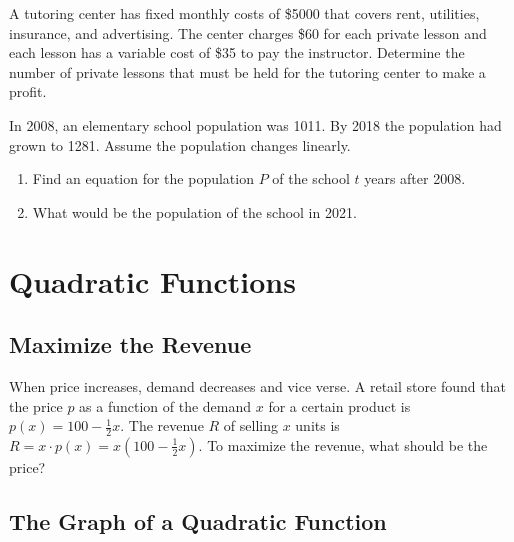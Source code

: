 \documentclass[
  en,11pt]{elegantbook}
\newcommand{\size}[2]{{\fontsize{#1}{0}\selectfont#2}}
\newenvironment{rmdthink}{
	\vspace*{0.5\baselineskip}
	\par\noindent
	\makebox[-4pt][r]{\color{green!90}\size{12}{\faLightbulbO}\,\,}
    \begin{tcolorbox}[
    enhanced,
    title={\textbf{\color{second}Think}},
    title style={left color=blue!10!green!20!white,right color=yellow!20!blue!20!white},
    colback=green!20!white,
    ]
    \sffamily
}{
    \end{tcolorbox}
	\par\ignorespacesafterend
}
\let\BeginKnitrBlock\begin \let\EndKnitrBlock\end
\begin{document}
\BeginKnitrBlock{exercise}
\protect\hypertarget{exr:unnamed-chunk-258}{}{\label{exr:unnamed-chunk-258} }
A tutoring center has fixed monthly costs of \$5000 that covers rent, utilities, insurance, and advertising.
The center charges \$60 for each private lesson and each lesson has a variable cost of \$35 to pay the
instructor. Determine the number of private lessons that must be held for the tutoring center to make a profit.
\EndKnitrBlock{exercise}

\BeginKnitrBlock{exercise}
\protect\hypertarget{exr:unnamed-chunk-259}{}{\label{exr:unnamed-chunk-259} }
In 2008, an elementary school population was 1011. By 2018 the population had grown to 1281. Assume the population changes linearly.

\begin{enumerate}
\def\labelenumi{\arabic{enumi}.}
\item
  Find an equation for the population \(P\) of the school \(t\) years after 2008.
\item
  What would be the population of the school in 2021.
\end{enumerate}
\EndKnitrBlock{exercise}

\hypertarget{quadratic-functions}{%
\chapter{Quadratic Functions}\label{quadratic-functions}}

\hypertarget{maximize-the-revenue}{%
\section{Maximize the Revenue}\label{maximize-the-revenue}}

\begin{rmdthink}

When price increases, demand decreases and vice verse. A retail store found that the price \(p\) as a function of the demand \(x\) for a certain product is \(p(x)=100-\frac12 x\). The revenue \(R\) of selling \(x\) units is \(R=x\cdot p(x)=x(100-\frac12x)\). To maximize the revenue, what should be the price?

\end{rmdthink}

\hypertarget{the-graph-of-a-quadratic-function}{%
\section{The Graph of a Quadratic Function}\label{the-graph-of-a-quadratic-function}}
\end{document}
